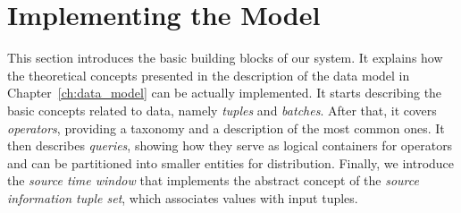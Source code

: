 \section{Implementing the Model}
This section introduces the basic building blocks of our system. It explains how the theoretical concepts
presented in the description of the data model in Chapter~\ref{ch:data_model} can be actually
implemented. It starts describing the basic concepts related to data, namely \textit{tuples} and
\textit{batches}. After that, it covers \textit{operators}, providing a taxonomy and a description of the
most common ones.
It then describes \textit{queries}, showing how they serve as logical containers for operators and can be
partitioned into smaller entities for distribution. Finally, we introduce the \emph{source time window}
that implements the abstract concept of the \emph{source information tuple set}, which associates \sic
values with input tuples.
\vspace{-10pt}
